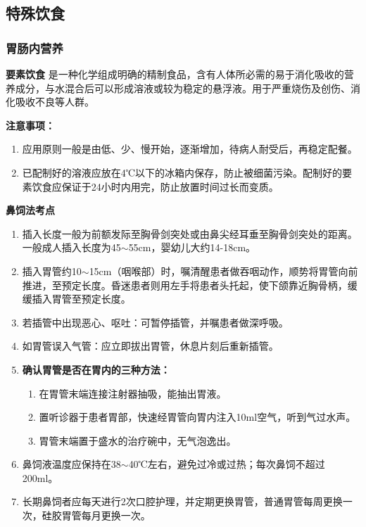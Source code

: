 \documentclass[11pt, a4paper]{ctexart}
\begin{document}
\subsection{特殊饮食}
\subsubsection{胃肠内营养}
\textbf{要素饮食}
是一种化学组成明确的精制食品，含有人体所必需的易于消化吸收的营养成分，与水混合后可以形成溶液或较为稳定的悬浮液。用于严重烧伤及创伤、消化吸收不良等人群。

\textbf{注意事项：}
\begin{enumerate}
	\item 应用原则一般是由低、少、慢开始，逐渐增加，待病人耐受后，再稳定配餐。
	\item 已配制好的溶液应放在4℃以下的冰箱内保存，防止被细菌污染。配制好的要素饮食应保证于24小时内用完，防止放置时间过长而变质。
\end{enumerate}

\textbf{鼻饲法考点}
\begin{enumerate}
	\item 插入长度一般为前额发际至胸骨剑突处或由鼻尖经耳垂至胸骨剑突处的距离。一般成人插入长度为45$\sim$55cm，婴幼儿大约14-18cm。
	\item 插入胃管约10$\sim$15cm（咽喉部）时，嘱清醒患者做吞咽动作，顺势将胃管向前推进，至预定长度。昏迷患者则用左手将患者头托起，使下颌靠近胸骨柄，缓缓插入胃管至预定长度。
	\item 若插管中出现恶心、呕吐：可暂停插管，并嘱患者做深呼吸。
	\item 如胃管误入气管：应立即拔出胃管，休息片刻后重新插管。
	\item \textbf{确认胃管是否在胃内的三种方法：}
	      \begin{enumerate}
		      \item 在胃管末端连接注射器抽吸，能抽出胃液。
		      \item 置听诊器于患者胃部，快速经胃管向胃内注入10ml空气，听到气过水声。
		      \item 胃管末端置于盛水的治疗碗中，无气泡逸出。
	      \end{enumerate}
	\item 鼻饲液温度应保持在38$\sim$40℃左右，避免过冷或过热；每次鼻饲不超过200ml。
	\item 长期鼻饲者应每天进行2次口腔护理，并定期更换胃管，普通胃管每周更换一次，硅胶胃管每月更换一次。
\end{enumerate}
\end{document}
